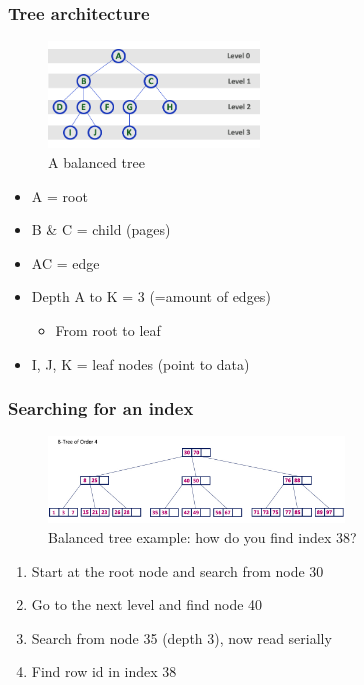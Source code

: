 \documentclass{article}
\begin{document}
\subsubsection{Tree architecture}

\begin{figure}[H]
    \centering
    \includegraphics[width=0.5\textwidth]{tree-architecture.png}
    \caption{A balanced tree}
\end{figure}

\begin{itemize}
    \item A = root
    \item B \& C = child (pages)
    \item AC = edge
    \item Depth A to K = 3 (=amount of edges)
    \begin{itemize}
        \item From root to leaf
    \end{itemize}
    \item I, J, K = leaf nodes (point to data)
\end{itemize}

\subsubsection{Searching for an index}

\begin{figure}[H]
    \centering
    \includegraphics[width=0.7\textwidth]{balanced-tree-index.png}
    \caption{Balanced tree example: how do you find index 38?}
\end{figure}

\begin{enumerate}
    \item Start at the root node and search from node 30
    \item Go to the next level and find node 40
    \item Search from node 35 (depth 3), now read serially
    \item Find row id in index 38
\end{enumerate}
\end{document}
